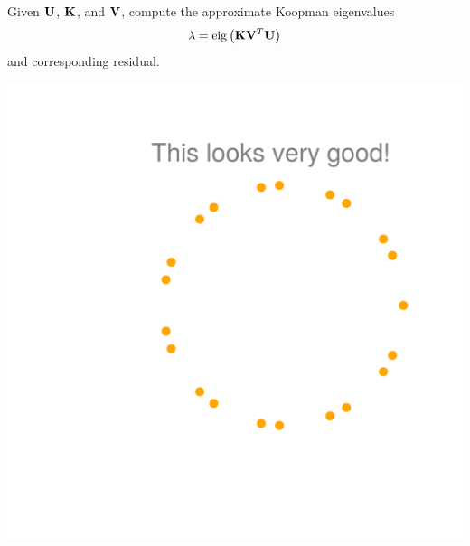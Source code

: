 \documentclass[aspectratio=169, usenames, dvipsnames]{beamer}
\begin{document}
\begin{frame}
  \vfill
  \begin{minipage}{.48\textwidth}
    Given $\vb{U}$, $\vb{K}$, and $\vb{V}$, compute the approximate Koopman eigenvalues
    \[
      \lambda = \mathrm{eig}\left( \vb{K} \vb{V}^T \vb{U} \right)
    \]
    and corresponding residual.
  \end{minipage}%
  \hfill
  \begin{minipage}{.48\textwidth}
    \centering
    \includegraphics[width=\textwidth]{Cylinder_eigenvalues}
  \end{minipage}

  \vfill
\end{frame}
\end{document}
